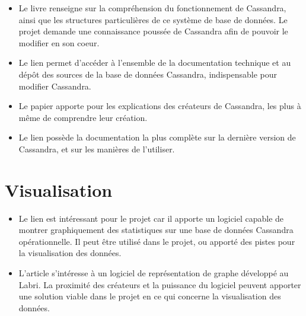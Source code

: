 \documentclass[12 pt]{article}
\begin{document}
\begin{itemize}
\item Le livre \cite{Hewitt2010} renseigne sur la compréhension du fonctionnement de Cassandra, ainsi que les structures particulières de ce système de base de données. Le projet demande une connaissance poussée de Cassandra afin de pouvoir le modifier en son coeur.

\item Le lien \cite{ApacheCassandra09} permet d'accéder à l'ensemble de la documentation technique et au dépôt des sources de la base de données Cassandra, indispensable pour modifier Cassandra.

\item Le papier \cite{FacebookCassandra09} apporte pour les explications des créateurs de Cassandra, les plus à même de comprendre leur création.

\item Le lien \cite{DSDocCassandra15} possède la documentation la plus complète sur la dernière version de Cassandra, et sur les manières de l'utiliser.

\end{itemize}

\section{Visualisation}

\begin{itemize}
\item Le lien \cite{DSOpsCenter14} est intéressant pour le projet car il apporte un logiciel capable de montrer graphiquement des statistiques sur une base de données Cassandra opérationnelle. Il peut être utilisé dans le projet, ou apporté des pistes pour la visualisation des données.

\item L'article \cite{Tulip12} s'intéresse à un logiciel de représentation de graphe développé au Labri. La proximité des créateurs et la puissance du logiciel peuvent apporter une solution viable dans le projet en ce qui concerne la visualisation des données.
\end{itemize} 


\end{document}
